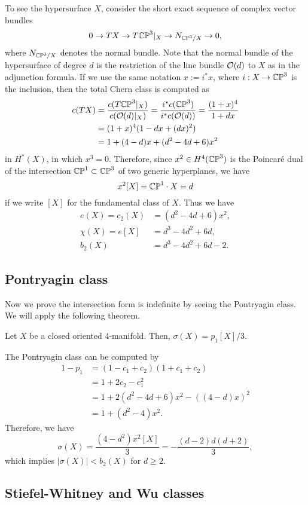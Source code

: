 \documentclass{../../../small}
\begin{document}
To see the hypersurface $X$, consider the short exact sequence of complex vector bundles
\[0\to TX\to T\mathbb{CP}^3|_X\to N_{\mathbb{CP}^3/X}\to0,\]
where $N_{\mathbb{CP}^3/X}$ denotes the normal bundle.
Note that the normal bundle of the hypersurface of degree $d$ is the restriction of the line bundle $\mathcal{O}(d)$ to $X$ as in the adjunction formula.
If we use the same notation $x:=i^*x$, where $i:X\to\mathbb{CP}^3$ is the inclusion, then the total Chern class is computed as
\begin{align*}
c(TX)&=\frac{c(T\mathbb{CP}^3|_X)}{c(\mathcal{O}(d)|_X)}=\frac{i^*c(\mathbb{CP}^3)}{i^*c(\mathcal{O}(d))}=\frac{(1+x)^4}{1+dx}\\
&=(1+x)^4(1-dx+(dx)^2)\\
&=1+(4-d)x+(d^2-4d+6)x^2
\end{align*}
in $H^*(X)$, in which $x^3=0$.
Therefore, since $x^2\in H^4(\mathbb{CP}^3)$ is the Poincar\'e dual of the intersection $\mathbb{CP}^1\subset\mathbb{CP}^3$ of two generic hyperplanes, we have
\[x^2[X]=\mathbb{CP}^1\cdot X=d\]
if we write $[X]$ for the fundamental class of $X$.
Thus we have
\begin{align*}
e(X)=c_2(X)&=(d^2-4d+6)x^2,\\
\chi(X)=e[X]&=d^3-4d^2+6d,\\
b_2(X)&=d^3-4d^2+6d-2.
\end{align*}

\subsection{Pontryagin class}

Now we prove the intersection form is indefinite by seeing the Pontryagin class.
We will apply the following theorem.
\begin{thm}
Let $X$ be a closed oriented 4-manifold.
Then, $\sigma(X)=p_1[X]/3$.
\end{thm}
The Pontryagin class can be computed by
\begin{align*}
1-p_1&=(1-c_1+c_2)(1+c_1+c_2)\\
&=1+2c_2-c_1^2\\
&=1+2(d^2-4d+6)x^2-((4-d)x)^2\\
&=1+(d^2-4)x^2.
\end{align*}
Therefore, we have
\[\sigma(X)=\frac{(4-d^2)x^2[X]}3=-\frac{(d-2)d(d+2)}3,\]
which implies $|\sigma(X)|<b_2(X)$ for $d\ge2$.

\subsection{Stiefel-Whitney and Wu classes}
\end{document}
